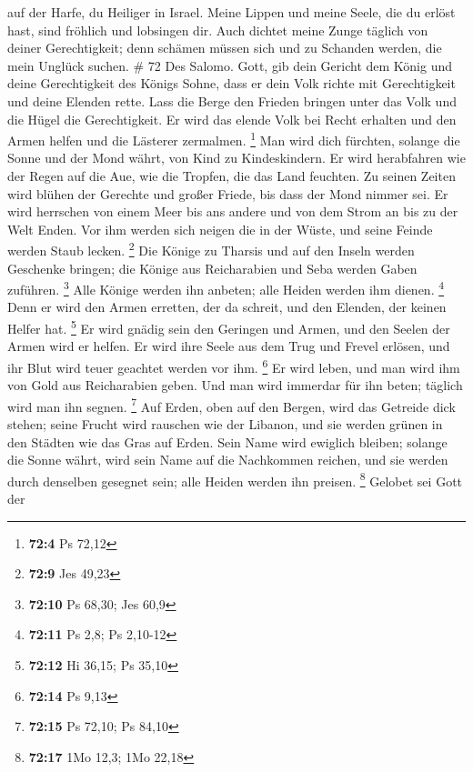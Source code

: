 auf der Harfe, du Heiliger in Israel.  Meine Lippen und
meine Seele, die du erlöst hast, sind fröhlich und lobsingen dir.
 Auch dichtet meine Zunge täglich von deiner
Gerechtigkeit; denn schämen müssen sich und zu Schanden werden, die mein
Unglück suchen. \# 72  Des Salomo. Gott, gib dein Gericht
dem König und deine Gerechtigkeit des Königs Sohne,  dass
er dein Volk richte mit Gerechtigkeit und deine Elenden rette.
 Lass die Berge den Frieden bringen unter das Volk und die
Hügel die Gerechtigkeit.  Er wird das elende Volk bei
Recht erhalten und den Armen helfen und die Lästerer zermalmen.
\footnote{\textbf{72:4} Ps 72,12}  Man wird dich fürchten,
solange die Sonne und der Mond währt, von Kind zu Kindeskindern.
 Er wird herabfahren wie der Regen auf die Aue, wie die
Tropfen, die das Land feuchten.  Zu seinen Zeiten wird
blühen der Gerechte und großer Friede, bis dass der Mond nimmer sei.
 Er wird herrschen von einem Meer bis ans andere und von
dem Strom an bis zu der Welt Enden.  Vor ihm werden sich
neigen die in der Wüste, und seine Feinde werden Staub lecken.
\footnote{\textbf{72:9} Jes 49,23}  Die Könige zu Tharsis
und auf den Inseln werden Geschenke bringen; die Könige aus Reicharabien
und Seba werden Gaben zuführen. \footnote{\textbf{72:10} Ps 68,30; Jes
  60,9}  Alle Könige werden ihn anbeten; alle Heiden
werden ihm dienen. \footnote{\textbf{72:11} Ps 2,8; Ps 2,10-12}
 Denn er wird den Armen erretten, der da schreit, und den
Elenden, der keinen Helfer hat. \footnote{\textbf{72:12} Hi 36,15; Ps
  35,10}  Er wird gnädig sein den Geringen und Armen, und
den Seelen der Armen wird er helfen.  Er wird ihre Seele
aus dem Trug und Frevel erlösen, und ihr Blut wird teuer geachtet werden
vor ihm. \footnote{\textbf{72:14} Ps 9,13}  Er wird
leben, und man wird ihm von Gold aus Reicharabien geben. Und man wird
immerdar für ihn beten; täglich wird man ihn segnen. \footnote{\textbf{72:15}
  Ps 72,10; Ps 84,10}  Auf Erden, oben auf den Bergen,
wird das Getreide dick stehen; seine Frucht wird rauschen wie der
Libanon, und sie werden grünen in den Städten wie das Gras auf Erden.
 Sein Name wird ewiglich bleiben; solange die Sonne
währt, wird sein Name auf die Nachkommen reichen, und sie werden durch
denselben gesegnet sein; alle Heiden werden ihn preisen. \footnote{\textbf{72:17}
  1Mo 12,3; 1Mo 22,18}  Gelobet sei Gott der
